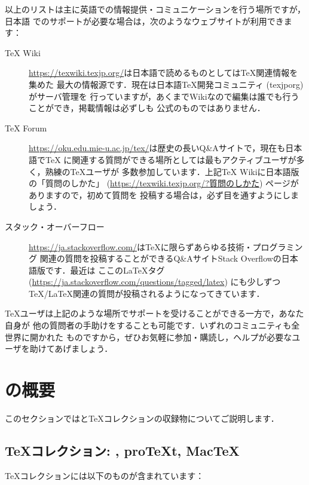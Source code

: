 \documentclass[uplatex,dvipdfmx]{jsarticle}
\begin{document}
以上のリストは主に英語での情報提供・コミュニケーションを行う場所ですが，日本語
でのサポートが必要な場合は，次のようなウェブサイトが利用できます：

\begin{description}
\item[{\TeX} Wiki]
\url{https://texwiki.texjp.org/}は日本語で読めるものとしては\TeX 関連情報を集めた
最大の情報源です．現在は日本語\TeX 開発コミュニティ (texjporg) がサーバ管理を
行っていますが，あくまでWikiなので編集は誰でも行うことができ，掲載情報は必ずしも
公式のものではありません．

\item[{\TeX} Forum]
\url{https://oku.edu.mie-u.ac.jp/tex/}は歴史の長いQ\&Aサイトで，現在も日本語で\TeX
に関連する質問ができる場所としては最もアクティブユーザが多く，熟練の\TeX ユーザが
多数参加しています．上記{\TeX} Wikiに日本語版の「質問のしかた」
(\url{https://texwiki.texjp.org/?質問のしかた}) ページがありますので，初めて質問を
投稿する場合は，必ず目を通すようにしましょう．

\item[スタック・オーバーフロー]
\url{https://ja.stackoverflow.com/}は\TeX に限らずあらゆる技術・プログラミング
関連の質問を投稿することができるQ\&AサイトStack Overflowの日本語版です．最近は
ここの\LaTeX タグ (\url{https://ja.stackoverflow.com/questions/tagged/latex})
にも少しずつ\TeX/\LaTeX 関連の質問が投稿されるようになってきています．
\end{description}

\TeX ユーザは上記のような場所でサポートを受けることができる一方で，あなた自身が
他の質問者の手助けをすることも可能です．いずれのコミュニティも全世界に開かれた
ものですから，ぜひお気軽に参加・購読し，ヘルプが必要なユーザを助けてあげましょう．

\section{\TL の概要}
\label{sec:overview-tl}

このセクションでは\TL と\TeX コレクションの収録物についてご説明します．

\subsection{\TeX コレクション: \TL, pro\TeX{}t, Mac\TeX}
\label{sec:tl-coll-dists}

\TeX コレクション\DVD には以下のものが含まれています：
\end{document}
